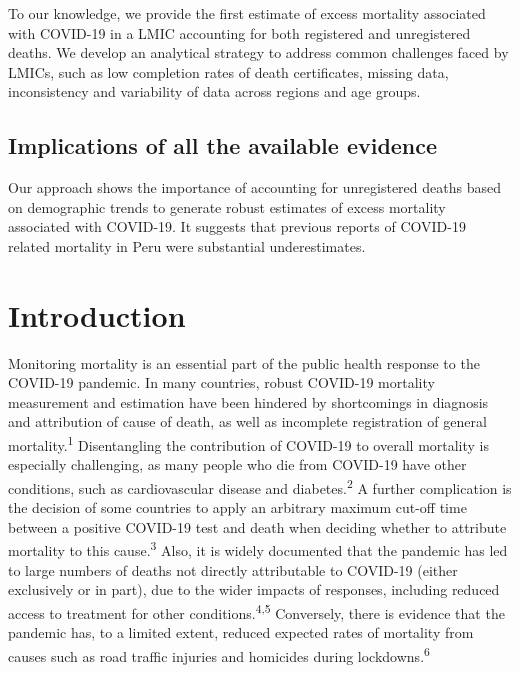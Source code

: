 \documentclass[
]{article}
\begin{document}
To our knowledge, we provide the first estimate of excess mortality associated with COVID-19 in a LMIC accounting for both registered and unregistered deaths. We develop an analytical strategy to address common challenges faced by LMICs, such as low completion rates of death certificates, missing data, inconsistency and variability of data across regions and age groups.

\hypertarget{implications-of-all-the-available-evidence}{%
\subsection*{Implications of all the available evidence}\label{implications-of-all-the-available-evidence}}

Our approach shows the importance of accounting for unregistered deaths based on demographic trends to generate robust estimates of excess mortality associated with COVID-19. It suggests that previous reports of COVID-19 related mortality in Peru were substantial underestimates.

\hypertarget{introduction}{%
\section{Introduction}\label{introduction}}

Monitoring mortality is an essential part of the public health response to the COVID-19 pandemic. In many countries, robust COVID-19 mortality measurement and estimation have been hindered by shortcomings in diagnosis and attribution of cause of death, as well as incomplete registration of general mortality.\textsuperscript{1} Disentangling the contribution of COVID-19 to overall mortality is especially challenging, as many people who die from COVID-19 have other conditions, such as cardiovascular disease and diabetes.\textsuperscript{2} A further complication is the decision of some countries to apply an arbitrary maximum cut-off time between a positive COVID-19 test and death when deciding whether to attribute mortality to this cause.\textsuperscript{3} Also, it is widely documented that the pandemic has led to large numbers of deaths not directly attributable to COVID-19 (either exclusively or in part), due to the wider impacts of responses, including reduced access to treatment for other conditions.\textsuperscript{4,5} Conversely, there is evidence that the pandemic has, to a limited extent, reduced expected rates of mortality from causes such as road traffic injuries and homicides during lockdowns.\textsuperscript{6}
\end{document}
